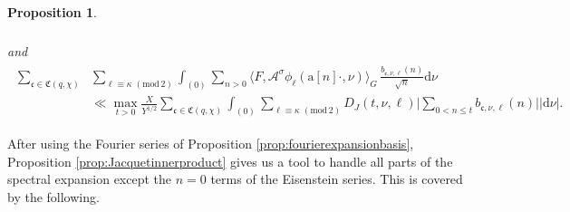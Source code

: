 \documentclass[12pt]{amsart}
\newtheorem{proposition}[theorem]{Proposition}
\theoremstyle{definition}
\theoremstyle{remark}
\numberwithin{equation}{section}
\newcommand{\1}{{\mathbf 1}}
\renewcommand{\c}{\mathfrak c}
\renewcommand{\d}{\mathrm d}
\renewcommand{\pmod}[1]{\,\,(\mathrm{mod}\,{#1})}
\begin{document}
\begin{proposition}
\begin{align}
\begin{split}
        \end{split}
    \end{align}
and
 \begin{align}\label{eq:JIPEis}
 \begin{split}
       \sum_{\c \in \mathfrak{C}(q,\chi)} &\sum_{\ell \equiv \kappa \pmod{2}} \int_{(0)}  \sum_{n > 0} 
 \langle F, \mathcal{A}^{\sigma} \phi_\ell(\mathrm{a}[n] \cdot,\nu) \rangle_{G} \, \frac{b_{\c,\nu,\ell}(n)}{\sqrt{n}} \d \nu  \\
 &\ll \max_{t > 0}  \frac{X}{Y^{1/2}} \sum_{\c \in \mathfrak{C}(q,\chi)}\int_{(0)} \sum_{\ell \equiv \kappa \pmod{2}} D_J(t,\nu,\ell) \bigg| \sum_{0< n \leq t}  b_{\c,\nu,\ell}(n) \bigg| |\d \nu|.
 \end{split}
    \end{align}
\end{proposition}

After using the Fourier series of Proposition \ref{prop:fourierexpansionbasis}, Proposition \ref{prop:Jacquetinnerproduct} gives us a tool to handle all parts of the spectral expansion except the $n=0$ terms of the Eisenstein series. This is covered by the following. 
\end{document}
